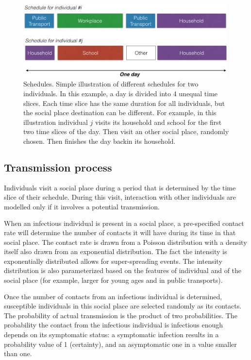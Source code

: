 \documentclass[11pt, onecolumn]{article}
\begin{document}
\begin{figure}[!ht]
\centering
    \includegraphics[angle=0,width=0.99\textwidth]{figures/schedule.png}
\caption{Schedules. Simple illustration of different schedules for two individuals. In this example, a day is divided into 4 unequal time slices. Each time slice has the same duration for all individuals, but the social place destination can be different. For example, in this illustration individual $j$ visits its household and school for the first two time slices of the day. Then visit an other social place, randomly chosen. Then finishes the day backin its household.}
\label{fig:SP_indiv}
\end{figure}


\subsection{Transmission process}

Individuals visit a social place during a period that is determined by the time slice of their schedule. During this visit, interaction with other individuals are modelled only if it involves a potential transmission. 

When an infectious individual is present in a social place, a pre-specified contact rate will determine the number of contacts it will have during its time in that social place. The contact rate is drawn from a Poisson distribution with a density itself also drawn from an exponential distribution. The fact the intensity is exponentially distributed allows for super-spreading events. The intensity distribution is also parameterized based on the features of individual and of the social place (for example, larger for young ages and in public transports).

Once the number of contacts from an infectious individual is determined, susceptible individuals in this social place are selected randomly as its contacts. The probability of actual transmission is the product of two probabilities. 
The probability the contact from the infectious individual is infectious enough depends on its symptomatic status: a symptomatic infection results in a probability value of 1 (certainty), and an asymptomatic one in a value smaller than one. 
\end{document}

